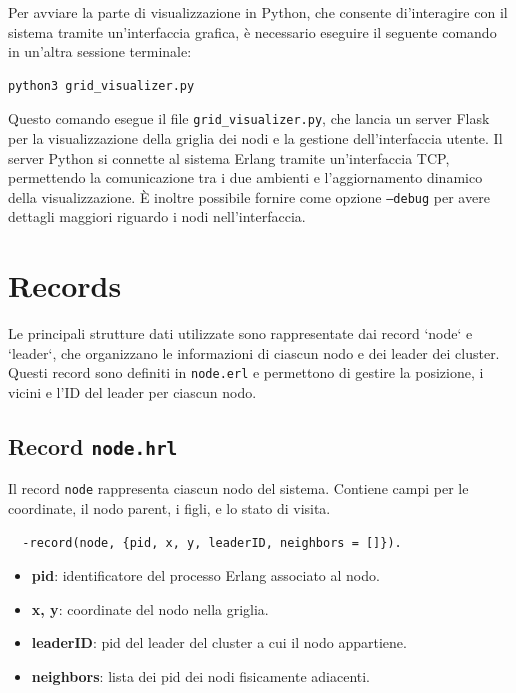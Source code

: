\documentclass[12pt, a4paper]{report}
\begin{document}
Per avviare la parte di visualizzazione in Python, che consente di'interagire con il sistema tramite un'interfaccia grafica, è necessario eseguire il seguente comando in un'altra sessione terminale:

\begin{tcolorbox}[title=Avvio dell'interfaccia grafica in Python]
\begin{verbatim}
python3 grid_visualizer.py
\end{verbatim}
\end{tcolorbox}

Questo comando esegue il file \texttt{grid\_visualizer.py}, che lancia un server Flask per la visualizzazione della griglia dei nodi e la gestione dell'interfaccia utente. Il server Python si connette al sistema Erlang tramite un'interfaccia TCP, permettendo la comunicazione tra i due ambienti e l'aggiornamento dinamico della visualizzazione. \`E inoltre possibile fornire come opzione \texttt{--debug} per avere dettagli maggiori riguardo i nodi nell'interfaccia.

\section{Records}

Le principali strutture dati utilizzate sono rappresentate dai record `node` e `leader`, che organizzano le informazioni di ciascun nodo e dei leader dei cluster. Questi record sono definiti in \texttt{node.erl} e permettono di gestire la posizione, i vicini e l'ID del leader per ciascun nodo.

\subsection{Record \texttt{node.hrl}}

Il record \texttt{node} rappresenta ciascun nodo del sistema. Contiene campi per le coordinate, il nodo parent, i figli, e lo stato di visita.

\begin{tcolorbox}[title=Definizione del record \texttt{node}]
\begin{verbatim}
  -record(node, {pid, x, y, leaderID, neighbors = []}).
\end{verbatim}
\end{tcolorbox}

\begin{itemize}
    \item \textbf{pid}: identificatore del processo Erlang associato al nodo.
    \item \textbf{x, y}: coordinate del nodo nella griglia.
    \item \textbf{leaderID}: pid del leader del cluster a cui il nodo appartiene.
    \item \textbf{neighbors}: lista dei pid dei nodi fisicamente adiacenti.
\end{itemize}
\end{document}
